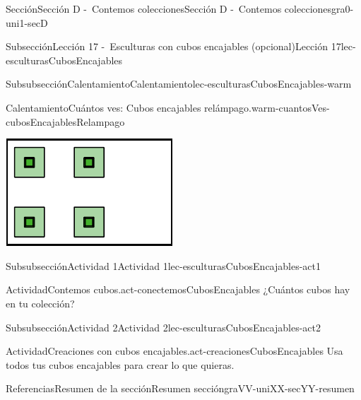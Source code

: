 \documentclass[twoside,10pt,]{article}
\begin{document}
\begin{sectionptx}{Sección}{Sección D -~Contemos colecciones}{}{Sección D -~Contemos colecciones}{}{}{gra0-uni1-secD}
\begin{subsectionptx}{Subsección}{Lección 17 -~Esculturas con cubos encajables (opcional)}{}{Lección 17}{}{}{lec-esculturasCubosEncajables}
\begin{subsubsectionptx}{Subsubsección}{Calentamiento}{}{Calentamiento}{}{}{lec-esculturasCubosEncajables-warm}
\begin{exploration}{Calentamiento}{Cuántos ves: Cubos encajables relámpago.}{warm-cuantosVes-cubosEncajablesRelampago}
\begin{sidebyside}{3}{0.0166666666666667}{0.0166666666666667}{0.0333333333333333}
\begin{sbspanel}{0.3}
\includegraphics[width=\linewidth]{external/svg-source/tikz-file-153036.pdf}
\end{sbspanel}%
\end{sidebyside}%
\end{exploration}%
\end{subsubsectionptx}
%
%
\typeout{************************************************}
\typeout{************************************************}
%
\begin{subsubsectionptx}{Subsubsección}{Actividad 1}{}{Actividad 1}{}{}{lec-esculturasCubosEncajables-act1}
\begin{activity}{Actividad}{Contemos cubos.}{act-conectemosCubosEncajables}%
¿Cuántos cubos hay en tu colección?%
\end{activity}%
\end{subsubsectionptx}
%
%
\typeout{************************************************}
\typeout{************************************************}
%
\begin{subsubsectionptx}{Subsubsección}{Actividad 2}{}{Actividad 2}{}{}{lec-esculturasCubosEncajables-act2}
\begin{activity}{Actividad}{Creaciones con cubos encajables.}{act-creacionesCubosEncajables}%
Usa todos tus cubos encajables para crear lo que quieras.%
\end{activity}%
\end{subsubsectionptx}
\end{subsectionptx}
%
%
\typeout{************************************************}
\typeout{************************************************}
%
\begin{references-subsection}{Referencias}{Resumen de la sección}{}{Resumen sección}{}{}{graVV-uniXX-secYY-resumen}

\end{references-subsection}
\end{sectionptx}
\end{document}
